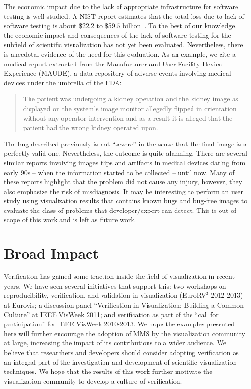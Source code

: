The economic impact due to the lack of appropriate infrastructure for software testing is well studied.
%
A NIST report estimates that the total loss due to lack of software testing is about \$22.2 to \$59.5 billion~\cite{tassey2002economic}. 
%
To the best of our knowledge, the economic impact and consequences of the lack of software testing for the subfield of scientific visualization has not yet been evaluated. 
%
Nevertheless, there is anecdotal evidence of the need for this evaluation. As an example, we cite a medical report extracted from the Manufacturer and User Facility Device Experience (MAUDE), a data repository of adverse events involving medical devices under the umbrella of the FDA:

{\singlespace
\begin{quote}
The patient was undergoing a kidney operation and the kidney image as displayed on the system's image monitor allegedly flipped in orientation without any operator intervention and as a result it is alleged that the patient had the wrong kidney operated upon.
\end{quote}}
The bug described previously is not  ``severe'' in the sense that the final image is a perfectly valid one. Nevertheless, the outcome is quite alarming. There are several similar reports involving images flips and artifacts in medical devices dating from early 90s -- when the information started to be collected -- until now. Many of these reports highlight that the problem did not cause any injury, however, they also emphasize the risk of misdiagnosis.
%
It may be interesting to perform an user study using visualization results that contains known bugs and bug-free images to evaluate the class of problems that developer/expert can detect.  This is out of scope of this work and is left as future work.


\section{Broad Impact}

Verification has gained some traction inside the field of visualization in recent years.  
%
We have seen several initiatives that support this: two workshops on reproducibility, verification, and validation in visualization (EuroRV$^3$ 2012-2013) at Eurovis; a discussion panel ``Verification in Visualization: Building a Common Culture'' at IEEE VisWeek 2011; and verification as part of the ``call for participation'' for IEEE VisWeek 2010-2013.
%
We hope the  examples presented here will further encourage the adoption of MMS by the visualization community at large, increasing the impact of its contributions  to a wider audience.
%
We believe that researchers and developers should consider adopting verification as an integral part of the investigation and development of scientific visualization techniques.
%
We hope that the results of this work further motivate the visualization
community to develop a culture of verification.


